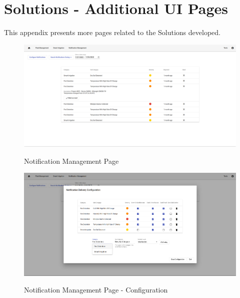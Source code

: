 \chapter{Solutions - Additional UI Pages}
\label{AppendixD2}

This appendix presents more pages related to the Solutions developed.

\begin{figure}[H]
   \centering
   \resizebox{\columnwidth}{!}
   {
      \includegraphics{assets/figures/ui/notification.png}
   }
   \caption[Notification Management Page]{Notification Management Page}
   \label{fig:AppendixD2:notification}
\end{figure}

\begin{figure}[H]
   \centering
   \resizebox{\columnwidth}{!}
   {
      \includegraphics{assets/figures/ui/notification-configuration.png}
   }
   \caption[Notification Management Page - Configuration]{Notification Management Page - Configuration}
   \label{fig:AppendixD2:notificationconfig}
\end{figure}

